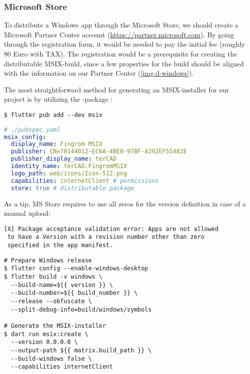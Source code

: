 
\newpage
\subsubsection{Microsoft Store}

To distribute a Windows app through the Microsoft Store, we should create a Microsoft Partner Center account
(\href{https://partner.microsoft.com}{https://partner.microsoft.com}). By going through the registration form, it 
would be needed to pay the initial fee (roughly 80 Euro with TAX). The registration would be a prerequisite for 
creating the distributable MSIX-build, since a few properties for the build should be aligned with the information on 
our Partner Center (\cref{img:d-windows}). 

The most straightforward method for generating an MSIX-installer for our project is by utilizing the 
-package :

\begin{lstlisting}[language=terminal]
$ flutter pub add --dev msix
\end{lstlisting}

\begin{lstlisting}[language=yaml]
# ./pubspec.yaml
msix_config:
  display_name: Fingrom MSIX
  publisher: CN=78144012-EC6A-4BE8-97BF-A392EF55482E
  publisher_display_name: terCAD
  identity_name: terCAD.FingromMSIX
  logo_path: web/icons/Icon-512.png
  capabilities: internetClient # permissions
  store: true # distributable package
\end{lstlisting}


\noindent As a tip, MS Store requires to use all zeros for the version definition in case of a manual upload:

\begin{lstlisting}[language=terminal]
[X] Package acceptance validation error: Apps are not allowed
 to have a Version with a revision number other than zero 
 specified in the app manifest.
\end{lstlisting}

\begin{lstlisting}[language=terminal]
# Prepare Windows release
$ flutter config --enable-windows-desktop
$ flutter build -v windows \
  --build-name=${{ version }} \
  --build-number=${{ build_number }} \
  --release --obfuscate \
  --split-debug-info=build/windows/symbols

# Generate the MSIX-installer
$ dart run msix:create \
  --version 0.0.0.0	\
  --output-path ${{ matrix.build_path }} \
  --build-windows false \
  --capabilities internetClient
\end{lstlisting}

